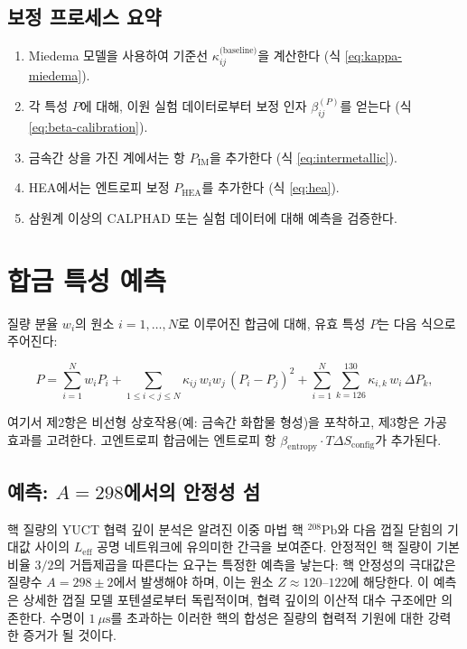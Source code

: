\documentclass[12pt,a4paper]{article}
\begin{document}
	\subsection{보정 프로세스 요약}
	
	\begin{enumerate}
		\item Miedema 모델을 사용하여 기준선 \(\kappa_{ij}^{\text{(baseline)}}\)을 계산한다 (식 \ref{eq:kappa-miedema}).
		\item 각 특성 \(P\)에 대해, 이원 실험 데이터로부터 보정 인자 \(\beta_{ij}^{(P)}\)를 얻는다 (식 \ref{eq:beta-calibration}).
		\item 금속간 상을 가진 계에서는 항 \(P_{\text{IM}}\)을 추가한다 (식 \ref{eq:intermetallic}).
		\item HEA에서는 엔트로피 보정 \(P_{\text{HEA}}\)를 추가한다 (식 \ref{eq:hea}).
		\item 삼원계 이상의 CALPHAD 또는 실험 데이터에 대해 예측을 검증한다.
	\end{enumerate}
	
	\section{합금 특성 예측}
	
	질량 분율 \(w_i\)의 원소 \(i = 1,\dots,N\)로 이루어진 합금에 대해, 유효 특성 \(P\)는 다음 식으로 주어진다:
	
	\[
	P = \sum_{i=1}^{N} w_i P_i
	+ \sum_{1\le i<j\le N} \kappa_{ij}\, w_i w_j\, (P_i - P_j)^2
	+ \sum_{i=1}^{N} \sum_{k=126}^{130} \kappa_{i,k}\, w_i\, \Delta P_k,
	\]
	
	여기서 제2항은 비선형 상호작용(예: 금속간 화합물 형성)을 포착하고, 제3항은 가공 효과를 고려한다. 고엔트로피 합금에는 엔트로피 항 \(\beta_{\text{entropy}} \cdot T \Delta S_{\text{config}}\)가 추가된다.
	
	\subsection{예측: \(A=298\)에서의 안정성 섬}
	
	핵 질량의 YUCT 협력 깊이 분석은 알려진 이중 마법 핵 \(^{208}\mathrm{Pb}\)와 다음 껍질 닫힘의 기대값 사이의 \(L_{\mathrm{eff}}\) 공명 네트워크에 유의미한 간극을 보여준다. 안정적인 핵 질량이 기본 비율 \(3/2\)의 거듭제곱을 따른다는 요구는 특정한 예측을 낳는다: 핵 안정성의 극대값은 질량수 \(A = 298 \pm 2\)에서 발생해야 하며, 이는 원소 \(Z \approx 120\)–\(122\)에 해당한다. 이 예측은 상세한 껍질 모델 포텐셜로부터 독립적이며, 협력 깊이의 이산적 대수 구조에만 의존한다. 수명이 \(1\ \mu\text{s}\)를 초과하는 이러한 핵의 합성은 질량의 협력적 기원에 대한 강력한 증거가 될 것이다.
	
\end{document}

